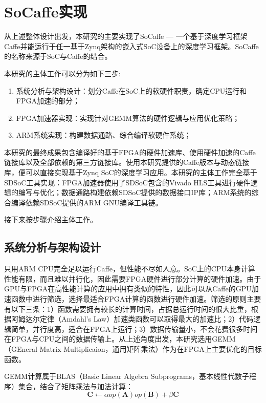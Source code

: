 \chapter{SoCaffe实现}

从上述整体设计出发，本研究的主要实现了SoCaffe — 一个基于深度学习框架Caffe并能运行于任一基于Zynq架构的嵌入式SoC设备上的深度学习框架。SoCaffe的名称来源于SoC与Caffe的结合。

本研究的主体工作可以分为如下三步:
\begin{enumerate}
\item 系统分析与架构设计：划分Caffe在SoC上的软硬件职责，确定CPU运行和FPGA加速的部分；
\item FPGA加速器实现：实现针对GEMM算法的硬件逻辑与应用优化策略；
\item ARM系统实现：构建数据通路、综合编译软硬件系统；
\end{enumerate}

本研究的最终成果包含编译好的基于FPGA的硬件加速库、使用硬件加速的Caffe链接库以及全部依赖的第三方链接库。使用本研究提供的Caffe版本与动态链接库，便可以直接实现基于Zynq SoC的深度学习应用。本研究的主体工作完全基于SDSoC工具实现：FPGA加速器使用了SDSoC包含的Vivado HLS工具进行硬件逻辑的编写与优化；数据通路构建依赖SDSoC提供的数据接口IP库；ARM系统的综合编译依赖SDSoC提供的ARM GNU编译工具链。

接下来按步骤介绍主体工作。

\section{系统分析与架构设计}

只用ARM CPU完全足以运行Caffe，但性能不尽如人意。SoC上的CPU本身计算性能有限，而且难以并行化，因此需要FPGA硬件进行部分计算的硬件加速。由于GPU与FPGA在高性能计算的应用中拥有类似的特性，因此可以从Caffe的GPU加速函数中进行筛选，选择最适合FPGA计算的函数进行硬件加速。筛选的原则主要有以下三条：1）函数需要拥有较长的计算时间，占据总运行时间的很大比重，根据阿姆达尔定律（Amdahl's Law）加速类函数可以取得最大的加速比；2）代码逻辑简单，并行度高，适合在FPGA上运行；3）数据传输量小，不会花费很多时间在FPGA与CPU之间的数据传输上。从上述角度出发，本研究选用GEMM（GEneral Matrix Multiplicaion，通用矩阵乘法）作为在FPGA上主要优化的目标函数。

GEMM计算属于BLAS（Basic Linear Algebra Subprograms，基本线性代数子程序）集合，结合了矩阵乘法与加法计算：
\begin{equation}\label{eq:gemm}
\mathbf{C} \leftarrow \alpha op(\mathbf{A})op(\mathbf{B}) + \beta \mathbf{C}
\end{equation}

